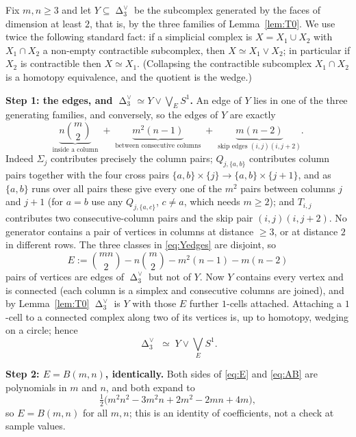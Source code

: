 \documentclass[11pt]{amsart}
\DeclareMathOperator{\Cut}{\Delta}
\newcommand{\Dual}[1]{#1^{\vee}}
\begin{document}
Fix $m,n\ge3$ and let $Y \subseteq \Dual{\Cut_3}$ be the subcomplex generated by the faces of
dimension at least $2$, that is, by the three families of Lemma~\ref{lem:T0}. We use twice the
following standard fact: if a simplicial complex is $X = X_1 \cup X_2$ with $X_1 \cap X_2$ a
non-empty contractible subcomplex, then $X \simeq X_1 \vee X_2$; in particular if $X_2$ is
contractible then $X \simeq X_1$. (Collapsing the contractible subcomplex $X_1 \cap X_2$ is a
homotopy equivalence, and the quotient is the wedge.)

\medskip
\noindent\textbf{Step 1: the edges, and $\Dual{\Cut_3} \simeq Y \vee \bigvee_E S^1$.}
An edge of $Y$ lies in one of the three generating families, and conversely, so the edges of $Y$
are exactly
\begin{equation}\label{eq:Yedges}
  \underbrace{n\binom{m}{2}}_{\text{inside a column}}
  \;+\;
  \underbrace{m^2(n-1)}_{\text{between consecutive columns}}
  \;+\;
  \underbrace{m(n-2)}_{\text{skip edges }(i,j)(i,j+2)}.
\end{equation}
Indeed $\Sigma_j$ contributes precisely the column pairs; $Q_{j,\{a,b\}}$ contributes column pairs
together with the four cross pairs $\{a,b\}\times\{j\} \to \{a,b\}\times\{j+1\}$, and as
$\{a,b\}$ runs over all pairs these give every one of the $m^2$ pairs between columns $j$ and
$j+1$ (for $a=b$ use any $Q_{j,\{a,c\}}$, $c \ne a$, which needs $m \ge 2$); and $T_{i,j}$
contributes two consecutive-column pairs and the skip pair $(i,j)(i,j+2)$. No generator contains a
pair of vertices in columns at distance $\ge 3$, or at distance $2$ in different rows. The three
classes in \eqref{eq:Yedges} are disjoint, so
\begin{equation}\label{eq:E}
  E := \binom{mn}{2} - n\binom{m}{2} - m^2(n-1) - m(n-2)
\end{equation}
pairs of vertices are edges of $\Dual{\Cut_3}$ but not of $Y$. Now $Y$ contains every vertex and
is connected (each column is a simplex and consecutive columns are joined), and by
Lemma~\ref{lem:T0} $\Dual{\Cut_3}$ is $Y$ with those $E$ further $1$-cells attached. Attaching a
$1$-cell to a connected complex along two of its vertices is, up to homotopy, wedging on a circle;
hence
\[
  \Dual{\Cut_3} \;\simeq\; Y \vee \textstyle\bigvee_{E} S^1 .
\]

\medskip
\noindent\textbf{Step 2: $E = B(m,n)$, identically.}
Both sides of \eqref{eq:E} and \eqref{eq:AB} are polynomials in $m$ and $n$, and both expand to
\[
  \tfrac12\bigl(m^2n^2 - 3m^2n + 2m^2 - 2mn + 4m\bigr),
\]
so $E = B(m,n)$ for all $m,n$; this is an identity of coefficients, not a check at sample values.
\end{document}
